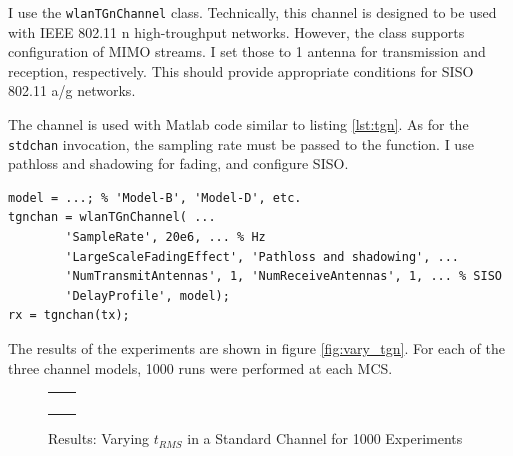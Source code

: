 I use the \texttt{wlanTGnChannel} class. Technically, this channel is designed to be used with IEEE 802.11 n high-troughput networks. However, the class supports configuration of MIMO streams. I set those to 1 antenna for transmission and reception, respectively. This should provide appropriate conditions for SISO 802.11 a/g networks.

The channel is used with Matlab code similar to listing \ref{lst:tgn}. As for the \texttt{stdchan} invocation, the sampling rate must be passed to the function. I use pathloss and shadowing for fading, and configure SISO.

\begin{lstlisting}[captionpos=b,caption={Matlab wlanTGnChannel Simulation},label=lst:tgn]
model = ...; % 'Model-B', 'Model-D', etc.
tgnchan = wlanTGnChannel( ...
        'SampleRate', 20e6, ... % Hz
        'LargeScaleFadingEffect', 'Pathloss and shadowing', ...
        'NumTransmitAntennas', 1, 'NumReceiveAntennas', 1, ... % SISO
        'DelayProfile', model);
rx = tgnchan(tx);
\end{lstlisting}

The results of the experiments are shown in figure \ref{fig:vary_tgn}. For each of the three channel models, 1000 runs were performed at each \gls{MCS}.

\begin{figure}[p]
	\centering
	\setlength\figureheight{3cm}
	\setlength{}
	\begin{tabular}{cc}
		\subfloat[MCS 0]{} &
		\subfloat[MCS 1]{} \\
		\subfloat[MCS 2]{} &
		\subfloat[MCS 3]{} \\
		\subfloat[MCS 4]{} &
		\subfloat[MCS 5]{} \\
		\subfloat[MCS 6]{} &
		\subfloat[MCS 7]{} \\
	\end{tabular}
	\caption{Results: Varying $t_{RMS}$ in a Standard Channel for 1000 Experiments}
	\label{fig:vary_trms}
\end{figure}

